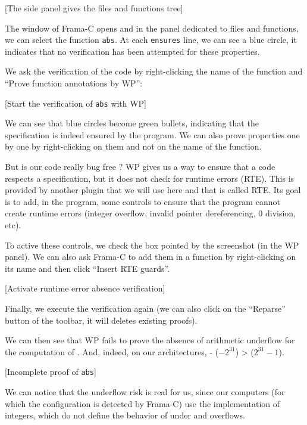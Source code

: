 \documentclass[middle]{zmdocument}
\begin{document}
[The side panel gives the files and functions tree]


The window of Frama-C opens and in the panel dedicated to files and
functions, we can select the function \texttt{abs}. At each
\texttt{ensures} line, we can see a blue circle, it indicates that no
verification has been attempted for these properties.



We ask the verification of the code by right-clicking the name of the
function and ``Prove function annotations by WP'':



[Start the verification of \texttt{abs} with WP]


We can see that blue circles become green bullets, indicating that the
specification is indeed ensured by the program. We can also prove
properties one by one by right-clicking on them and not on the name of
the function.



But is our code really bug free ? WP gives us a way to ensure that a
code respects a specification, but it does not check for runtime errors
(RTE). This is provided by another plugin that we will use here and that
is called RTE. Its goal is to add, in the program, some controls to
ensure that the program cannot create runtime errors (integer overflow,
invalid pointer dereferencing, 0 division, etc).



To active these controls, we check the box pointed by the screenshot (in
the WP panel). We can also ask Frama-C to add them in a function by
right-clicking on its name and then click ``Insert RTE guards''.



[Activate runtime error absence verification]


Finally, we execute the verification again (we can also click on the
``Reparse'' button of the toolbar, it will deletes existing proofs).

We can then see that WP fails to prove the absence of arithmetic
underflow for the computation of . And, indeed, on our
architectures, - ($-2^{31}$) >  ($2^{31}-1$).



[Incomplete proof of \texttt{abs}]


\begin{Information}
We can notice that the underflow risk
is real for us, since our computers (for which the
configuration is detected by Frama-C) use the 
implementation of integers, which do not define
the behavior of under and overflows.
\end{Information}
\end{document}
